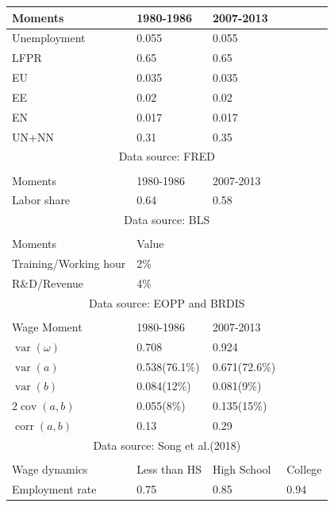 \documentclass[12pt]{article}
\newcommand{\1}{\mathbb{1}}
\DeclareMathOperator{\var}{var}
\DeclareMathOperator{\cov}{cov}
\DeclareMathOperator{\corr}{corr}
\begin{document}
\begin{table}[h!]
\centering
\begin{tabular}{l|lll}

\hline \hline
Moments            & 1980-1986     & 2007-2013      		\\
\hline 
Unemployment		&	0.055	&	0.055 		\\
LFPR 						& 0.65 		&0.65 			\\
EU							& 0.035	&0.035 		\\
EE 							& 0.02 		& 0.02			\\
EN     						& 0.017 	& 0.017     	\\
UN+NN 					& 0.31 		& 0.35        	\\
\hline
\multicolumn{4}{c}{\small Data source: FRED} \\
\multicolumn{4}{c}{} \\
\hline
Moments            & 1980-1986     & 2007-2013      		\\
\hline 
Labor share     & 0.64 & 0.58        						\\
\hline
\multicolumn{4}{c}{\small Data source: BLS} \\
\multicolumn{4}{c}{} \\
\hline 
Moments   &      Value       \\
\hline 
Training/Working hour  & 2\%   \\
R\&D/Revenue & 4\%  \\
\hline 
\multicolumn{4}{c}{\small Data source: EOPP and BRDIS} \\
\multicolumn{4}{c}{} \\
\hline 
Wage Moment           & 1980-1986     & 2007-2013      		\\
\hline 
$\var(\omega)$    & 0.708         & 0.924                             \\
$\var(a)$              & 0.538(76.1\%) & 0.671(72.6\%)   	\\
$\var(b)$             & 0.084(12\%)   & 0.081(9\%)             \\
$2\cov(a,b)$          & 0.055(8\%)    & 0.135(15\%)           	\\
$\corr(a,b)$        & 0.13  	& 0.29           						\\
\hline
\multicolumn{4}{c}{\small Data source: Song et al.(2018)\cite{Songetal2018}} \\
\multicolumn{4}{c}{} \\
\hline 
Wage dynamics         & Less than HS & High School & College \\
\hline 
Employment rate                & 0.75                  & 0.85        & 0.94    \\

\end{tabular}
\end{table}
\end{document}
